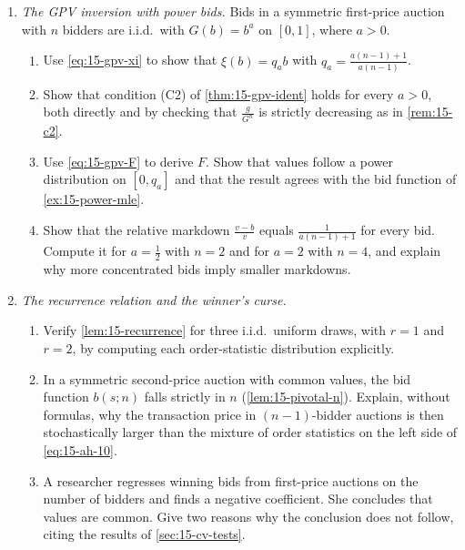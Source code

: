 \begin{enumerate}[label=\arabic*., leftmargin=*, itemsep=6pt]
\item \textit{The GPV inversion with power bids.} Bids in a symmetric first-price auction with $n$ bidders are
i.i.d.\ with $G(b)=b^a$ on $[0,1]$, where $a>0$.
\begin{enumerate}[label=(\alph*)]
  \item Use \eqref{eq:15-gpv-xi} to show that $\xi(b)=q_a b$ with $q_a=\frac{a(n-1)+1}{a(n-1)}$.
  \item Show that condition (C2) of \cref{thm:15-gpv-ident} holds for every $a>0$, both directly and by checking
  that $\frac{g}{G^n}$ is strictly decreasing as in \cref{rem:15-c2}.
  \item Use \eqref{eq:15-gpv-F} to derive $F$. Show that values follow a power distribution on $[0,q_a]$ and
  that the result agrees with the bid function of \cref{ex:15-power-mle}.
  \item Show that the relative markdown $\frac{v-b}{v}$ equals $\frac{1}{a(n-1)+1}$ for every bid. Compute it
  for $a=\frac12$ with $n=2$ and for $a=2$ with $n=4$, and explain why more concentrated bids imply smaller
  markdowns.
\end{enumerate}

\item \textit{The recurrence relation and the winner's curse.}
\begin{enumerate}[label=(\alph*)]
  \item Verify \cref{lem:15-recurrence} for three i.i.d.\ uniform draws, with $r=1$ and $r=2$, by computing each
  order-statistic distribution explicitly.
  \item In a symmetric second-price auction with common values, the bid function $b(s;n)$ falls strictly in $n$
  (\cref{lem:15-pivotal-n}). Explain, without formulas, why the transaction price in $(n-1)$-bidder auctions is
  then stochastically larger than the mixture of order statistics on the left side of \eqref{eq:15-ah-10}.
  \item A researcher regresses winning bids from first-price auctions on the number of bidders and finds a
  negative coefficient. She concludes that values are common. Give two reasons why the conclusion does not
  follow, citing the results of \cref{sec:15-cv-tests}.
\end{enumerate}


\end{enumerate}
